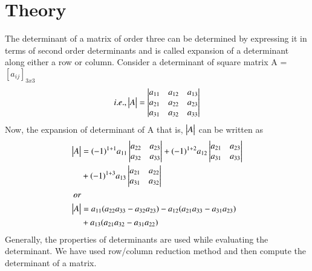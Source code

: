 \documentclass[journal,12pt,twocolumn]{IEEEtran}
\begin{document}
\section{Theory}
	The determinant of a matrix of order three can be determined by expressing it in terms of second order determinants and is called expansion of a determinant along either a row or column.
	Consider a determinant of square matrix A = $[a_{ij}]_{3x3}$
	\begin{align}
		i.e.,  \begin{vmatrix}A\end{vmatrix} = \begin{vmatrix}a_{11} & a_{12} & a_{13}\\ a_{21} & a_{22} & a_{23}\\ a_{31} & a_{32} & a_{33}\end{vmatrix}
	\end{align}
Now, the expansion of determinant of A that is, $\begin{vmatrix}A\end{vmatrix}$ can be written as 
\begin{align}
	\begin{vmatrix}A\end{vmatrix} &= (-1)^{1+1} a_{11} \begin{vmatrix}a_{22} & a_{23}\\a_{32} & a_{33}\end{vmatrix} + (-1)^{1+2} a_{12} \begin{vmatrix}a_{21} & a_{23}\\a_{31} & a_{33}\end{vmatrix} \nonumber \\ 
	&+ (-1)^{1+3} a_{13} \begin{vmatrix}a_{21} & a_{22}\\a_{31} & a_{32}\end{vmatrix}\\
	or \nonumber\\
	\begin{vmatrix}A\end{vmatrix} &= a_{11}(a_{22}a_{33} - a_{32}a_{23}) - a_{12}(a_{21}a_{33} - a_{31}a_{23}) \nonumber \\
	&+ a_{13}(a_{21}a_{32} - a_{31}a_{22})
\end{align}
Generally, the properties of determinants are used while evaluating the determinant. We have used row/column reduction method and then compute the determinant of a matrix.
\end{document}
